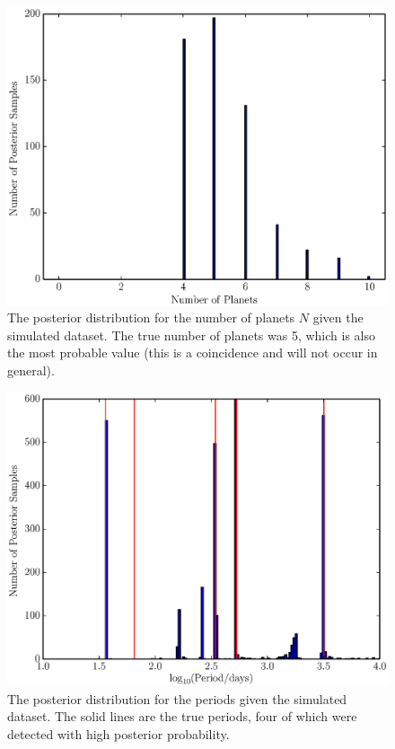 \documentclass[useAMS,usenatbib]{mn2e}
\begin{document}
\begin{figure}
\includegraphics[scale=0.4]{Figures/fake_data_N.eps}
\caption{The posterior distribution for the number of planets $N$ given the
simulated dataset. The true number of planets was 5, which is also the most
probable value (this is a coincidence and will not occur in general).
\label{fig:fake_data_N}}
\end{figure}

\begin{figure}
\includegraphics[scale=0.4]{Figures/fake_data_periods.eps}
\caption{The posterior distribution for the periods given the simulated
dataset. The solid lines are the true periods, four of which were detected
with high posterior probability.\label{fig:fake_data_periods}}
\end{figure}
\end{document}
